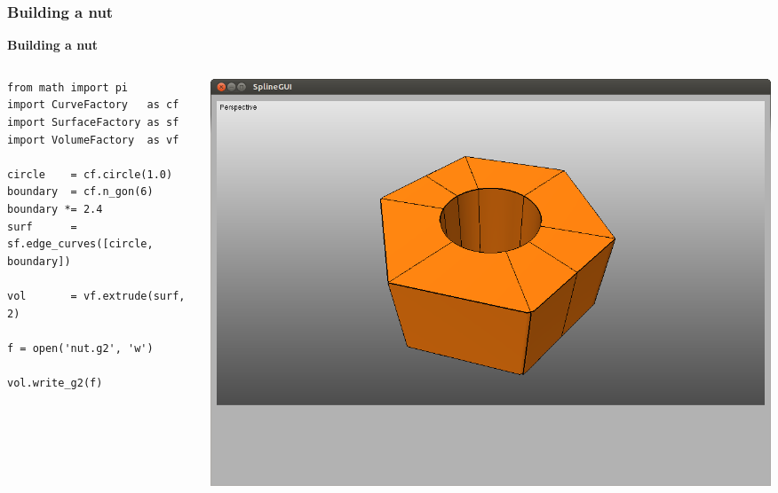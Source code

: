 \documentclass{beamer}
\theoremstyle{plain}
\theoremstyle{definition}
\begin{document}
\begin{frame}[fragile]
\frametitle{Building a nut}
\textbf{Building a nut}

\begin{columns}
    \begin{column}{.50\linewidth}
        \begin{listing}[H]
            \tiny
            \begin{verbatim}
from math import pi
import CurveFactory   as cf
import SurfaceFactory as sf
import VolumeFactory  as vf

circle    = cf.circle(1.0)
boundary  = cf.n_gon(6)
boundary *= 2.4
surf      = sf.edge_curves([circle, boundary])

vol       = vf.extrude(surf, 2)

f = open('nut.g2', 'w')

vol.write_g2(f)
            \end{verbatim}
        \end{listing}
    \end{column}
    \begin{column}{.45\linewidth}
        \includegraphics[width=\linewidth]{nut2}
    \end{column}
\end{columns}

\end{frame}

\end{document}

